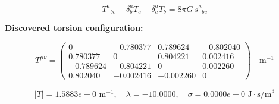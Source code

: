 
\begin{equation}
  T^a{}_{bc} + \delta^a_b T_c - \delta^a_c T_b = 8\pi G \, s^a{}_{bc}
\end{equation}

\textbf{Discovered torsion configuration:}

\begin{equation}
  T^{\mu\nu} = \begin{pmatrix}
    0 & -0.780377 & 0.789624 & -0.802040 \\
    0.780377 & 0 & 0.804221 & 0.002416 \\
    -0.789624 & -0.804221 & 0 & 0.002260 \\
    0.802040 & -0.002416 & -0.002260 & 0
  \end{pmatrix} \quad \text{m}^{-1}
\end{equation}

\begin{equation}
  |T| = 1.5883e+0 \text{ m}^{-1}, \quad
  \lambda = -10.0000, \quad
  \sigma = 0.0000e+0 \text{ J}\cdot\text{s/m}^3
\end{equation}